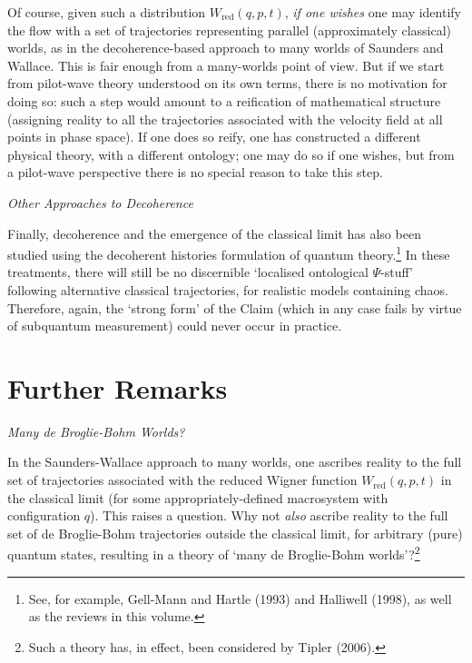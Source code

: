 \documentclass{article}%
\begin{document}
Of course, given such a distribution $W_{\mathrm{red}}(q,p,t)$, \textit{if one
wishes} one may identify the flow with a set of trajectories representing
parallel (approximately classical) worlds, as in the decoherence-based
approach to many worlds of Saunders and Wallace. This is fair enough from a
many-worlds point of view. But if we start from pilot-wave theory understood
on its own terms, there is no motivation for doing so: such a step would
amount to a reification of mathematical structure (assigning reality to all
the trajectories associated with the velocity field at all points in phase
space). If one does so reify, one has constructed a different physical theory,
with a different ontology; one may do so if one wishes, but from a pilot-wave
perspective there is no special reason to take this step.

\begin{center}
\textit{Other Approaches to Decoherence}
\end{center}

Finally, decoherence and the emergence of the classical limit has also been
studied using the decoherent histories formulation of quantum
theory.\footnote{See, for example, Gell-Mann and Hartle (1993) and Halliwell
(1998), as well as the reviews in this volume.} In these treatments, there
will still be no discernible `localised ontological $\Psi$-stuff' following
alternative classical trajectories, for realistic models containing chaos.
Therefore, again, the `strong form' of the Claim (which in any case fails by
virtue of subquantum measurement) could never occur in practice.

\section{Further Remarks}

\begin{center}
\textit{Many de Broglie-Bohm Worlds?}
\end{center}

In the Saunders-Wallace approach to many worlds, one ascribes reality to the
full set of trajectories associated with the reduced Wigner function
$W_{\mathrm{red}}(q,p,t)$ in the classical limit (for some
appropriately-defined macrosystem with configuration $q$). This raises a
question. Why not \textit{also} ascribe reality to the full set of de
Broglie-Bohm trajectories outside the classical limit, for arbitrary (pure)
quantum states, resulting in a theory of `many de Broglie-Bohm
worlds'?\footnote{Such a theory has, in effect, been considered by Tipler
(2006).}
\end{document}
